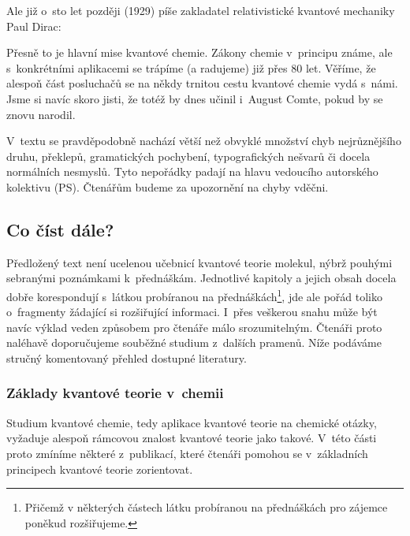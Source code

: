 \bigskip

Ale již o~sto let později (1929) píše zakladatel relativistické kvantové mechaniky Paul Dirac:

\bigskip


\bigskip

Přesně to je hlavní mise kvantové chemie. Zákony chemie v~principu známe, ale s~konkrétními aplikacemi se trápíme (a radujeme) již přes 80 let. Věříme, že alespoň část posluchačů se na někdy trnitou cestu kvantové chemie vydá s~námi. Jsme si navíc skoro jisti, že totéž by dnes učinil i~August Comte, pokud by se znovu narodil.
 

V~textu se pravděpodobně nachází větší než obvyklé množství chyb nejrůznějšího druhu, překlepů, gramatických pochybení, typografických nešvarů či docela normálních nesmyslů. Tyto nepořádky padají na hlavu vedoucího autorského kolektivu (PS). Čtenářům budeme za upozornění na chyby vděčni.  



\subsection{Co číst dále?}
Předložený text není ucelenou učebnicí kvantové teorie molekul, nýbrž pouhými sebranými poznámkami k~přednáškám. Jednotlivé kapitoly a jejich obsah docela dobře korespondují s~látkou probíranou na přednáškách\footnote{Přičemž v některých částech látku probíranou na přednáškách pro zájemce poněkud rozšiřujeme.}, jde ale pořád toliko o~fragmenty žádající si rozšiřující informaci. I~přes veškerou snahu může být navíc výklad veden způsobem pro čtenáře málo srozumitelným. Čtenáři proto naléhavě doporučujeme souběžné studium z~dalších pramenů. Níže podáváme stručný komentovaný přehled dostupné literatury.

   	
\subsubsection{Základy kvantové teorie v~chemii}

Studium kvantové chemie, tedy aplikace kvantové teorie na chemické otázky, vyžaduje alespoň rámcovou znalost kvantové teorie jako takové. V~této části proto zmíníme některé z~publikací, které čtenáři pomohou se v~základních principech kvantové teorie zorientovat.

